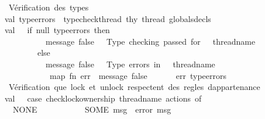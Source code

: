 \begin{isabellebody}
\ \ \ \ \ \ \ \ {\isacharparenleft}{\kern0pt}{\isacharasterisk}{\kern0pt}\ Vérification\ des\ types\ {\isacharasterisk}{\kern0pt}{\isacharparenright}{\kern0pt}\isanewline
\ \ \ \ \ \ \ \ val\ type{\isacharunderscore}{\kern0pt}errors\ {\isacharequal}{\kern0pt}\ type{\isacharunderscore}{\kern0pt}check{\isacharunderscore}{\kern0pt}thread\ thy\ thread\ globals{\isacharunderscore}{\kern0pt}decls\isanewline
\ \ \ \ \ \ \ \ val\ {\isacharunderscore}{\kern0pt}\ {\isacharequal}{\kern0pt}\ if\ null\ type{\isacharunderscore}{\kern0pt}errors\ then\isanewline
\ \ \ \ \ \ \ \ \ \ \ \ \ \ \ \ \ \ message\ false\ {\isacharparenleft}{\kern0pt}{\isachardoublequote}{\kern0pt}\ {\isasymcheckmark}\ Type\ checking\ passed\ for\ {\isachardoublequote}{\kern0pt}\ {\isacharcircum}{\kern0pt}\ thread{\isacharunderscore}{\kern0pt}name{\isacharparenright}{\kern0pt}\isanewline
\ \ \ \ \ \ \ \ \ \ \ \ \ \ \ \ else\isanewline
\ \ \ \ \ \ \ \ \ \ \ \ \ \ \ \ \ \ {\isacharparenleft}{\kern0pt}message\ false\ {\isacharparenleft}{\kern0pt}{\isachardoublequote}{\kern0pt}\ {\isasymcrossmark}\ Type\ errors\ in\ {\isachardoublequote}{\kern0pt}\ {\isacharcircum}{\kern0pt}\ thread{\isacharunderscore}{\kern0pt}name\ {\isacharcircum}{\kern0pt}\ {\isachardoublequote}{\kern0pt}{\isacharcolon}{\kern0pt}{\isachardoublequote}{\kern0pt}{\isacharparenright}{\kern0pt}{\isacharsemicolon}{\kern0pt}\isanewline
\ \ \ \ \ \ \ \ \ \ \ \ \ \ \ \ \ \ \ map\ {\isacharparenleft}{\kern0pt}fn\ err\ {\isacharequal}{\kern0pt}{\isachargreater}{\kern0pt}\ message\ false\ {\isacharparenleft}{\kern0pt}{\isachardoublequote}{\kern0pt}\ \ \ \ {\isachardoublequote}{\kern0pt}\ {\isacharcircum}{\kern0pt}\ err{\isacharparenright}{\kern0pt}{\isacharparenright}{\kern0pt}\ type{\isacharunderscore}{\kern0pt}errors{\isacharsemicolon}{\kern0pt}\ {\isacharparenleft}{\kern0pt}{\isacharparenright}{\kern0pt}{\isacharparenright}{\kern0pt}\isanewline
\ \ \ \ \ \ \ \ {\isacharparenleft}{\kern0pt}{\isacharasterisk}{\kern0pt}\ Vérification\ que\ lock\ et\ unlock\ respectent\ des\ regles\ d{\isacharprime}{\kern0pt}appartenance\ {\isacharasterisk}{\kern0pt}{\isacharparenright}{\kern0pt}\isanewline
\ \ \ \ \ \ \ \ val\ {\isacharunderscore}{\kern0pt}\ {\isacharequal}{\kern0pt}\ case\ check{\isacharunderscore}{\kern0pt}lock{\isacharunderscore}{\kern0pt}ownership\ thread{\isacharunderscore}{\kern0pt}name\ actions\ of\isanewline
\ \ \ \ \ \ \ \ \ \ NONE\ {\isacharequal}{\kern0pt}{\isachargreater}{\kern0pt}\ {\isacharparenleft}{\kern0pt}{\isacharparenright}{\kern0pt}\isanewline
\ \ \ \ \ \ \ \ {\isacharbar}{\kern0pt}\ SOME\ msg\ {\isacharequal}{\kern0pt}{\isachargreater}{\kern0pt}\ error\ msg\isanewline

\end{isabellebody}

